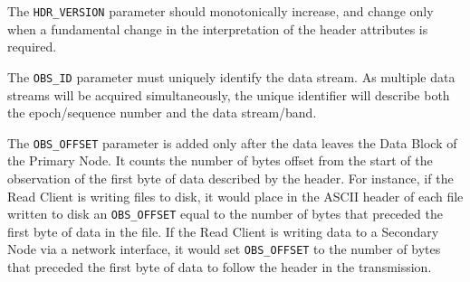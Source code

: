 The {\tt HDR\_VERSION} parameter should monotonically increase, and
change only when a fundamental change in the interpretation of the
header attributes is required.

The {\tt OBS\_ID} parameter must uniquely identify the data stream.
As multiple data streams will be acquired simultaneously, the unique
identifier will describe both the epoch/sequence number and the data
stream/band.

The {\tt OBS\_OFFSET} parameter is added only after the data leaves
the Data Block of the Primary Node.  It counts the number of bytes
offset from the start of the observation of the first byte of data
described by the header.  For instance, if the Read Client is writing
files to disk, it would place in the ASCII header of each file written
to disk an {\tt OBS\_OFFSET} equal to the number of bytes that
preceded the first byte of data in the file.  If the Read Client is
writing data to a Secondary Node via a network interface, it would set
{\tt OBS\_OFFSET} to the number of bytes that preceded the first byte
of data to follow the header in the transmission.




